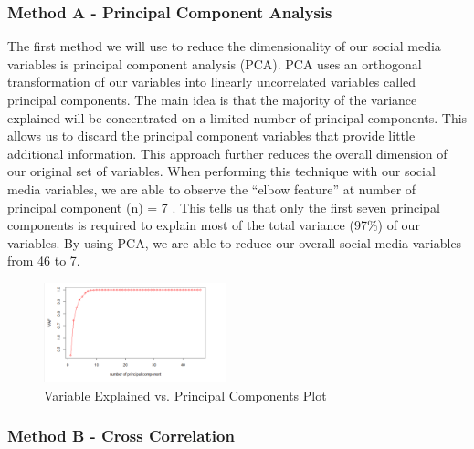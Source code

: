 \documentclass[12pt,oneside]{chicagocapstone}
\begin{document}
\hypertarget{method-a---principal-component-analysis}{%
\subsubsection*{Method A - Principal Component Analysis}\label{method-a---principal-component-analysis}}

The first method we will use to reduce the dimensionality of our social media variables is principal component analysis (PCA). PCA uses an orthogonal transformation of our variables into linearly uncorrelated variables called principal components. The main idea is that the majority of the variance explained will be concentrated on a limited number of principal components. This allows us to discard the principal component variables that provide little additional information. This approach further reduces the overall dimension of our original set of variables. When performing this technique with our social media variables, we are able to observe the ``elbow feature'' at number of principal component (n) = 7 . This tells us that only the first seven principal components is required to explain most of the total variance (97\%) of our variables. By using PCA, we are able to reduce our overall social media variables from 46 to 7.
\begin{figure}

{\centering \includegraphics[width=200px,angle = 0, scale=2.1]{figure/pca} 

}

\caption{Variable Explained vs. Principal Components Plot}\label{fig:pca}
\end{figure}
\hypertarget{method-b---cross-correlation}{%
\subsubsection*{Method B - Cross Correlation}\label{method-b---cross-correlation}}
\end{document}
